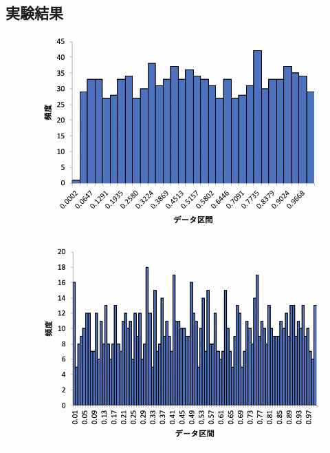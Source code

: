 \documentclass[12pt]{jarticle}
\begin{document}
\subsection{実験結果}
\begin{figure}[h]
    \begin{center}
        \includegraphics[scale=0.7]{kadai4_2graph1.png}
    \end{center}
    \caption{}
\end{figure}
\begin{figure}[h]
    \begin{center}
        \includegraphics[scale=0.7]{kadai4_2graph2.png}
    \end{center}
    \caption{}
\end{figure}
\end{document}
